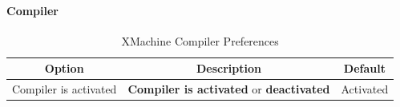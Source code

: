 \paragraph{Compiler}
\begin{table}[!htbp]
  \centering
  \begin{tabular}{|p{}|p{}|p{}|}
    \hline
    \multicolumn{1}{|c}{\textbf{Option}} & \multicolumn{1}{|c}{\textbf{Description}} &%
                                                                                       \multicolumn{1}{|c|}{\textbf{Default}} \\
    \hline
    Compiler is activated & \textbf{Compiler is activated} or \textbf{deactivated} & Activated \\
    \hline
  \end{tabular}
  \caption{XMachine Compiler Preferences}
  \label{tab:xmachine-compiler-preference}
\end{table}

